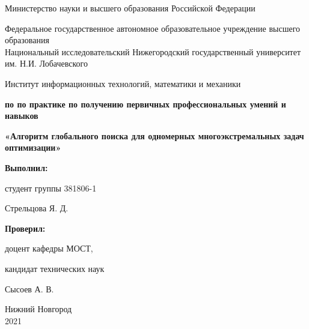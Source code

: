 \documentclass{report}
\begin{document}
\begin{large}
\begin{titlepage}

\begin{center}
Министерство науки и высшего образования Российской Федерации
\end{center}


\begin{center}
Федеральное государственное автономное образовательное учреждение высшего образования \\
Национальный исследовательский Нижегородский государственный университет им. Н.И. Лобачевского
\end{center}

\begin{center}
Институт информационных технологий, математики и механики
\end{center}

\vspace{4em}

\begin{LARGE}
\begin{center}
\textbf{ по по практике по получению первичных профессиональных умений и навыков} \\
\end{center}
\begin{center}
\textbf{\Large«Алгоритм глобального поиска для одномерных многоэкстремальных задач оптимизации»} \\
\end{center}
\end{LARGE}

\vspace{4em}

\newbox{\lbox}
\newlength{\maxl}
\setlength{\maxl}{\wd\lbox}
\hfill\parbox{7cm}{
\hspace*{5cm}\hspace*{-5cm}\textbf{Выполнил:} \par студент группы 381806-1 \par Стрельцова Я. Д.\par
\par
\hspace*{5cm}\hspace*{-5cm}\textbf{Проверил:}\par доцент кафедры МОСТ, \par кандидат технических наук \par Сысоев А. В.\par
}

\vspace{\fill}

\begin{center} Нижний Новгород \\ 2021 \end{center}

\end{titlepage}
\end{large}
\end{document}
